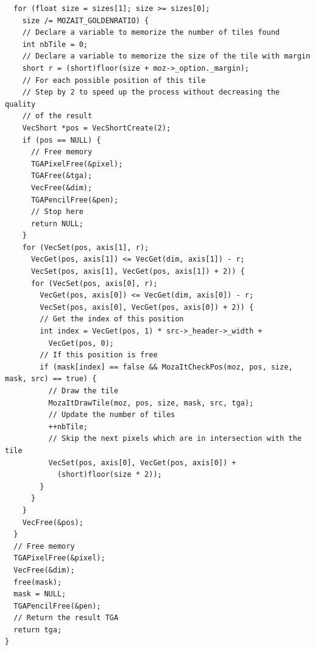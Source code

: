 \documentclass[12pt, a4paper]{article}
\begin{document}
\begin{scriptsize}
\begin{ttfamily}
\begin{lstlisting}
  for (float size = sizes[1]; size >= sizes[0]; 
    size /= MOZAIT_GOLDENRATIO) {
    // Declare a variable to memorize the number of tiles found
    int nbTile = 0;
    // Declare a variable to memorize the size of the tile with margin
    short r = (short)floor(size + moz->_option._margin);
    // For each possible position of this tile
    // Step by 2 to speed up the process without decreasing the quality
    // of the result
    VecShort *pos = VecShortCreate(2);
    if (pos == NULL) {
      // Free memory
      TGAPixelFree(&pixel);
      TGAFree(&tga);
      VecFree(&dim);
      TGAPencilFree(&pen);
      // Stop here
      return NULL; 
    }
    for (VecSet(pos, axis[1], r); 
      VecGet(pos, axis[1]) <= VecGet(dim, axis[1]) - r; 
      VecSet(pos, axis[1], VecGet(pos, axis[1]) + 2)) { 
      for (VecSet(pos, axis[0], r); 
        VecGet(pos, axis[0]) <= VecGet(dim, axis[0]) - r; 
        VecSet(pos, axis[0], VecGet(pos, axis[0]) + 2)) { 
        // Get the index of this position
        int index = VecGet(pos, 1) * src->_header->_width + 
          VecGet(pos, 0);
        // If this position is free
        if (mask[index] == false && MozaItCheckPos(moz, pos, size, mask, src) == true) {
          // Draw the tile
          MozaItDrawTile(moz, pos, size, mask, src, tga);
          // Update the number of tiles
          ++nbTile;
          // Skip the next pixels which are in intersection with the tile
          VecSet(pos, axis[0], VecGet(pos, axis[0]) + 
            (short)floor(size * 2));
        }
      }
    }
    VecFree(&pos);
  }
  // Free memory
  TGAPixelFree(&pixel);
  VecFree(&dim);
  free(mask);
  mask = NULL;
  TGAPencilFree(&pen);
  // Return the result TGA
  return tga;
}


\end{lstlisting}
\end{ttfamily}
\end{scriptsize}
\end{document}
